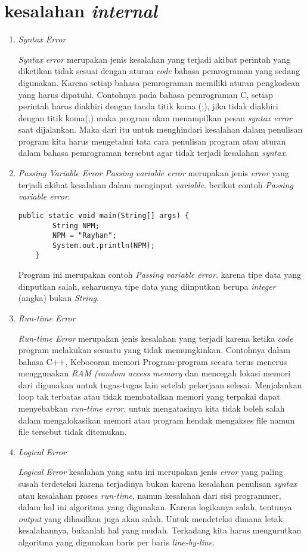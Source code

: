 \section{kesalahan \textit{internal}}
\begin{enumerate}
\item \textit{Syntax Error}
\par 
\textit{Syntax error} merupakan jenis kesalahan yang terjadi akibat perintah yang diketikan tidak sesuai dengan aturan \textit{code} bahasa pemrograman yang sedang digunakan. Karena setiap bahasa pemrograman memiliki aturan pengkodean yang harus dipatuhi. Contohnya pada bahasa pemrograman C, setiap perintah harus diakhiri dengan tanda titik koma (;), jika tidak diakhiri dengan titik koma(;) maka program akan menampilkan pesan \textit{syntax error} saat dijalankan. Maka dari itu untuk menghindari kesalahan dalam penulisan program kita harus mengetahui tata cara penulisan program atau aturan dalam bahasa pemrograman tersebut agar tidak terjadi kesalahan \textit{syntax}.

\item \textit{Passing Variable Error}
\textit{Passing variable error} merupakan jenis \textit{error} yang terjadi akibat kesalahan dalam menginput \textit{variable}. berikut contoh \textit{Passing variable error}.
\begin{verbatim}
public static void main(String[] args) {	
		String NPM;		
		NPM = "Rayhan";
		System.out.println(NPM);
	}
\end{verbatim}
Program ini merupakan contoh \textit{Passing variable error}. karena tipe data yang dinputkan salah, seharusnya tipe data yang diinputkan berupa \textit{integer} (angka) bukan \textit{String}.

\item \textit{Run-time Error}
\par
\textit{Run-time Error} merupakan jenis kesalahan yang terjadi karena ketika \textit{code} program melakukan sesuatu yang tidak memungkinkan. Contohnya dalam bahasa C++, Kebocoran memori Program-program secara terus menerus menggunakan \textit{RAM (random access memory} dan mencegah lokasi memori dari digunakan untuk tugas-tugas lain setelah pekerjaan selesai. Menjalankan loop tak terbatas atau tidak membatalkan memori yang terpakai dapat menyebabkan \textit{run-time error}. untuk mengatasinya kita tidak boleh salah dalam mengalokasikan memori atau program hendak mengakses file namun file tersebut tidak ditemukan.

\item \textit{Logical Error}
\par
\textit{Logical Error} kesalahan yang satu ini merupakan jenis \textit{error} yang paling susah terdeteksi karena terjadinya bukan karena kesalahan penulisan \textit{syntax} atau kesalahan proses \textit{run-time}, namun kesalahan dari sisi programmer, dalam hal ini algoritma yang digunakan. Karena logikanya salah, tentunya \textit{output} yang dihasilkan juga akan salah. Untuk mendeteksi dimana letak kesalahannya, bukanlah hal yang mudah. Terkadang kita harus mengurutkan algoritma yang digunakan baris per baris \textit{line-by-line}.
\end{enumerate}

